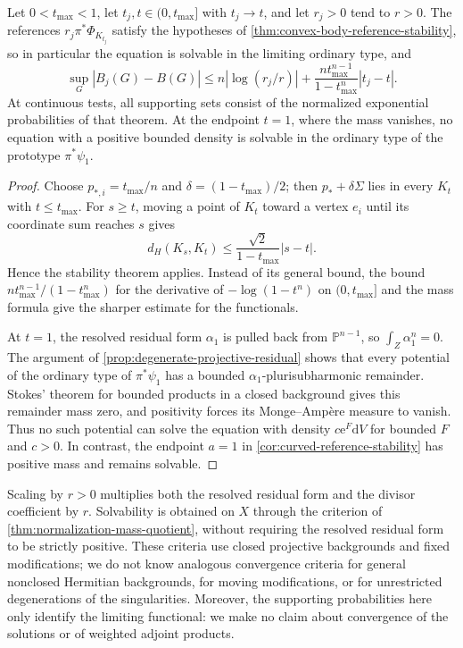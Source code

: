 \begin{corollary}\label{cor:degenerate-residual-reference-stability}
Let $0<t_{\max}<1$, let $t_j,t\in(0,t_{\max}]$ with $t_j\to t$, and let $r_j>0$ tend to $r>0$. The references $r_j\pi^*\Phi_{K_{t_j}}$ satisfy the hypotheses of \cref{thm:convex-body-reference-stability}, so in particular the equation is solvable in the limiting ordinary type, and
\[
 \sup_G|B_j(G)-B(G)|
 \leq n|\log(r_j/r)|+
       \frac{nt_{\max}^{n-1}}{1-t_{\max}^n}|t_j-t|.
\]
At continuous tests, all supporting sets consist of the normalized exponential probabilities of that theorem. At the endpoint $t=1$, where the mass vanishes, no equation with a positive bounded density is solvable in the ordinary type of the prototype $\pi^*\psi_1$.
\end{corollary}
\begin{proof}
Choose $p_{*,i}=t_{\max}/n$ and $\delta=(1-t_{\max})/2$; then $p_*+\delta\Sigma$ lies in every $K_t$ with $t\leq t_{\max}$. For $s\geq t$, moving a point of $K_t$ toward a vertex $e_i$ until its coordinate sum reaches $s$ gives
\[
 d_H(K_s,K_t)\leq\frac{\sqrt2}{1-t_{\max}}|s-t|.
\]
Hence the stability theorem applies. Instead of its general bound, the bound $n t_{\max}^{n-1}/(1-t_{\max}^n)$ for the derivative of $-\log(1-t^n)$ on $(0,t_{\max}]$ and the mass formula give the sharper estimate for the functionals.

At $t=1$, the resolved residual form $\alpha_1$ is pulled back from $\mathbb P^{n-1}$, so $\int_Z\alpha_1^n=0$. The argument of \cref{prop:degenerate-projective-residual} shows that every potential of the ordinary type of $\pi^*\psi_1$ has a bounded $\alpha_1$-plurisubharmonic remainder. Stokes' theorem for bounded products in a closed background gives this remainder mass zero, and positivity forces its Monge--Amp\`ere measure to vanish. Thus no such potential can solve the equation with density $c\mathrm{e}^F\mathrm{d}V$ for bounded $F$ and $c>0$. In contrast, the endpoint $a=1$ in \cref{cor:curved-reference-stability} has positive mass and remains solvable.
\end{proof}

Scaling by $r>0$ multiplies both the resolved residual form and the divisor coefficient by $r$. Solvability is obtained on $X$ through the criterion of \cref{thm:normalization-mass-quotient}, without requiring the resolved residual form to be strictly positive. These criteria use closed projective backgrounds and fixed modifications; we do not know analogous convergence criteria for general nonclosed Hermitian backgrounds, for moving modifications, or for unrestricted degenerations of the singularities. Moreover, the supporting probabilities here only identify the limiting functional: we make no claim about convergence of the solutions or of weighted adjoint products.
